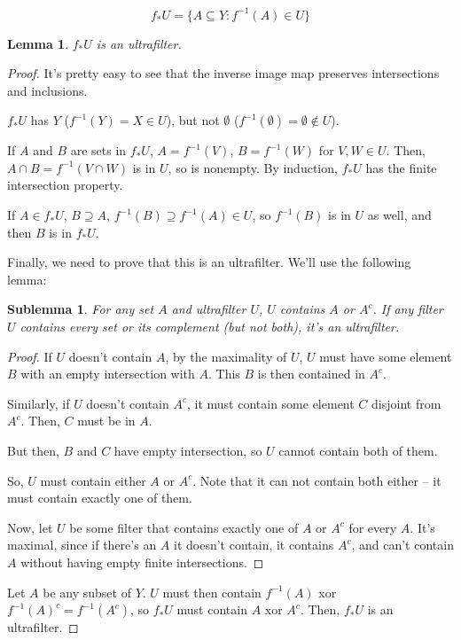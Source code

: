 \documentclass{article}
\newtheorem*{lemma}{Lemma}
\newtheorem*{sublemma}{Sublemma}
\begin{document}
          \[f_*U = \{A \subseteq Y: f^{-1}(A) \in U\}\]

          \begin{lemma}
          $f_*U$ is an ultrafilter.
          \end{lemma}

          \begin{proof}
          It's pretty easy to see that the inverse image map preserves
          intersections and inclusions.

          $f_*U$ has $Y$ ($f^{-1}(Y) = X \in U$), but not $\emptyset$
          ($f^{-1}(\emptyset) = \emptyset \notin U$).

          If $A$ and $B$ are sets in $f_*U$, $A = f^{-1}(V)$, $B = f^{-1}(W)$ for
          $V, W \in U$. Then, $A \cap B = f^{-1}(V \cap W)$ is in $U$, so is
          nonempty. By induction, $f_*U$ has the finite intersection property.

          If $A \in f_*U$, $B \supseteq A$, $f^{-1}(B) \supseteq f^{-1}(A) \in U$,
          so $f^{-1}(B)$ is in $U$ as well, and then $B$ is in $f_*U$.

          Finally, we need to prove that this is an ultrafilter. We'll use the
          following lemma:

          \begin{sublemma}
          For any set $A$ and ultrafilter $U$, $U$ contains $A$ or $A^c$. If any
          filter $U$ contains every set or its complement (but not both), it's
          an ultrafilter.
          \end{sublemma}

          \begin{proof}
          If $U$ doesn't contain $A$, by the maximality of $U$, $U$ must have
          some element $B$ with an empty intersection with $A$. This $B$ is then
          contained in $A^c$.

          Similarly, if $U$ doesn't contain $A^c$, it must contain some element
          $C$ disjoint from $A^c$. Then, $C$ must be in $A$.

          But then, $B$ and $C$ have empty intersection, so $U$ cannot contain
          both of them.

          So, $U$ must contain either $A$ or $A^c$. Note that it can not contain
          both either -- it must contain exactly one of them.

          Now, let $U$ be some filter that contains exactly one of $A$
          or $A^c$ for every $A$. It's maximal, since if there's an $A$ it
          doesn't contain, it contains $A^c$, and can't contain $A$ without
          having empty finite intersections.
          \end{proof}

          Let $A$ be any subset of $Y$. $U$ must then contain $f^{-1}(A)$ xor
          $f^{-1}(A)^c = f^{-1}(A^c)$, so $f_*U$ must contain $A$ xor $A^c$. Then,
          $f_*U$ is an ultrafilter.
          \end{proof}
\end{document}
